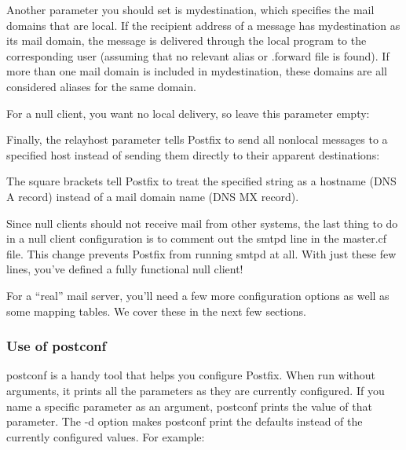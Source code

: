 
Another parameter you should set is {mydestination}, which specifies the
mail domains that are local. If the recipient address of a message has
{mydestination} as its mail domain, the message is delivered through the
{local} program to the corresponding user (assuming that no relevant
alias or {.forward} file is found). If more than one mail domain is
included in{ mydestination}, these domains are all considered aliases
for the same domain.

For a null client, you want no local delivery, so leave this parameter
empty:


Finally, the {relayhost} parameter tells Postfix to send all nonlocal
messages to a specified host instead of sending them directly to their
apparent destinations:


The square brackets tell Postfix to treat the specified string as a
hostname (DNS A record) instead of a mail domain name (DNS MX record).

Since null clients should not receive mail from other systems, the last
thing to do in a null client configuration is to comment out the {smtpd}
line in the {master.cf} file. This change prevents Postfix from running
{smtpd} at all. With just these few lines, you've defined a fully
functional null client!

For a ``real'' mail server, you'll need a few more configuration options
as well as some mapping tables. We cover these in the next few sections.

\subsubsection[Use of
{postconf}]{\texorpdfstring{\protect\hypertarget{part0026_split_061.htmlux5cux23_idTextAnchor1176}{}{}Use
of {postconf}}{Use of postconf}}

{\protect\hypertarget{part0026_split_061.htmlux5cux23_idIndexMarker2711}{}{}}{postconf
}is a handy tool that helps you configure Postfix. When run without
arguments, it prints all the parameters as they are currently
configured. If you name a specific parameter as an argument, {postconf}
prints the value of that parameter. The {-d} option makes {postconf}
print the defaults instead of the currently configured values. For
example:


